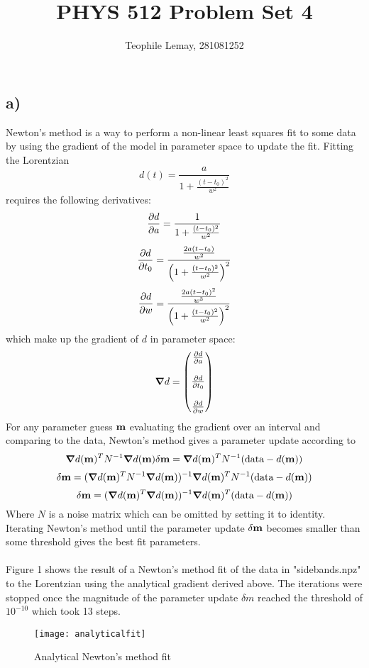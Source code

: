 \documentclass{article}
\title{PHYS 512 Problem Set 4}
\author{Teophile Lemay, 281081252}
\date{}
\newcommand{\<}[1]{\left\langle #1 \right\rangle }
\begin{document}
\maketitle
	
\section{}
\subsection{a)}
Newton's method is a way to perform a non-linear least squares fit to some data by using the gradient of the model in parameter space to update the fit. Fitting the Lorentzian 
\[d(t) = \frac{a}{1 + \frac{(t-t_0)^2}{w^2}}\] 
requires the following derivatives:
\[ \pdv{d}{a} = \frac{1}{1 + \frac{(t-t_0)^2}{w^2}} \]
\[ \pdv{d}{t_0} = \frac{ \frac{2a(t-t_0)}{w^2} }{ \left( 1 + \frac{(t-t_0)^2}{w^2} \right)^2 } \]
\[ \pdv{d}{w} = \frac{ \frac{2a(t-t_0)^2}{w^3} }{ \left( 1 + \frac{(t-t_0)^2}{w^2} \right)^2 } \]
which make up the gradient of $d$ in parameter space:
\[\grad{d} = 
\begin{pmatrix}
	\pdv{d}{a} \\\\
	
	\pdv{d}{t_0} \\\\
	
	\pdv{d}{w}
\end{pmatrix}\]
For any parameter guess $\vb{m}$ evaluating the gradient over an interval and comparing to the data, Newton's method gives a parameter update according to
\[ \grad{d(\vb{m})}^T N^{-1} \grad{d(\vb{m})} \delta \vb{m} = \grad{d(\vb{m})}^T N^{-1} (\text{data} - d(\vb{m}))\]
\[ \delta\vb{m} = (\grad{d(\vb{m})}^T N^{-1} \grad{d(\vb{m})})^{-1}\grad{d(\vb{m})}^T N^{-1} (\text{data} - d(\vb{m})) \]
\[ \delta\vb{m} = (\grad{d(\vb{m})}^T \grad{d(\vb{m})})^{-1}\grad{d(\vb{m})}^T (\text{data} - d(\vb{m})) \]
Where $N$ is a noise matrix which can be omitted by setting it to identity. Iterating Newton's method until the parameter update $\delta \vb{m}$ becomes smaller than some threshold gives the best fit parameters.\\
\\
Figure 1 shows the result of a Newton's method fit of the data in "sidebands.npz" to the Lorentzian using the analytical gradient derived above. The iterations were stopped once the magnitude of the parameter update $\delta m$ reached the threshold of $10^{-10}$ which took 13 steps.
\begin{figure}[h]
	\caption{Analytical Newton's method fit}
	\centering
	\texttt{[image: analyticalfit]}
\end{figure}
\end{document}
